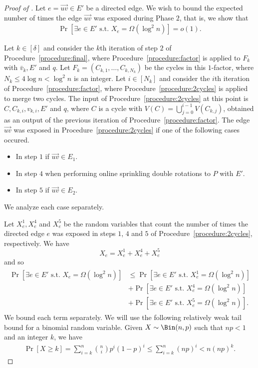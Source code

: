 \documentclass{article}
\begin{document}
\begin{proof}[Proof of ]
		
		Let $e = \overrightarrow{uv} \in E'$ be a directed edge.
		We wish to bound the expected number of times the edge $\overrightarrow{uv}$ was exposed during Phase $2$, that is, we show that
		\begin{align*}
		\Pr\left[\exists e\in E' \text{ s.t. } X_e = \Omega(\log^2 n) \right] = o(1).
		\end{align*}
		
		Let $k \in [\delta]$ and consider the $k$th iteration of step $2$ of Procedure~\ref{procedure:final}, where Procedure~\ref{procedure:factor} is applied to $F_k$ with $\bar{v}_k, E'$ and $q$.
		Let $F_k = (C_{k,1}, \ldots, C_{k,N_k})$ be the cycles in this $1$-factor, where $N_k \le 4\log n < \log^2 n$ is an integer.
		Let $i \in [N_k]$ and consider the $i$th iteration of Procedure~\ref{procedure:factor}, where Procedure~\ref{procedure:2cycles} is applied to merge two cycles.
		The input of Procedure~\ref{procedure:2cycles} at this point is $C, C_{k,i}, v_{k,i}, E'$ and $q$, where $C$ is a cycle with $V(C) = \bigcup_{j=0}^{i-1}V(C_{k,j})$, obtained as an output of the previous iteration of Procedure~\ref{procedure:factor}.
		The edge $\overrightarrow{uv}$ was exposed in Procedure~\ref{procedure:2cycles} if one of the following cases occured.
		\begin{itemize}
			\item In step $1$ if $\overrightarrow{uv} \in E_1$.
			\item In step $4$ when performing online sprinkling double rotations to $P$ with $E'$.
			\item In step $5$ if $\overrightarrow{uv} \in E_2$.
		\end{itemize}
		We analyze each case separately.
		
		Let $X^1_e, X^4_e$ and $X^5_e$ be the random variables that count the number of times the directed edge $e$ was exposed in steps $1$, $4$ and $5$ of Procedure~\ref{procedure:2cycles}, respectively.
		We have
		\[X_e = X^1_e + X^4_e + X^5_e\]
		and so
		\begin{align}
		\begin{split}
		\label{eq:uvProb145}
		\Pr\left[\exists e \in E' \text{ s.t. } X_e = \Omega(\log^2 n)  \right] &\le \Pr\left[\exists e \in E' \text{ s.t. } X^1_e = \Omega(\log^2 n)  \right] \\
		&+ \Pr\left[\exists e \in E' \text{ s.t. } X^4_e = \Omega(\log^2 n)  \right] \\
		&+ \Pr\left[\exists e \in E' \text{ s.t. } X^5_e = \Omega(\log^2 n) \right].
		\end{split}
		\end{align}
		We bound each term separately.
		We will use the following relatively weak tail bound for a binomial random variable.
		Given $X \sim \Bin(n,p)$ such that $np < 1$ and an integer $k$, we have
		\begin{align*}
		\Pr\left[X \ge k \right] = \sum_{i=k}^n \binom{n}{i}p^i(1-p)^i \le \sum_{i=k}^n (np)^i < n(np)^k.
		\end{align*}
		

\end{proof}
\end{document}
